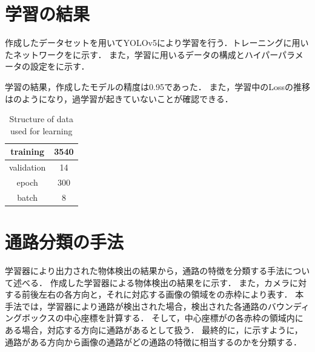 \documentclass[../main]{subfiles}
\begin{document}
        \section{学習の結果}
        作成したデータセットを用いてYOLOv5により学習を行う．トレーニングに用いたネットワークをに示す．
        また，学習に用いるデータの構成とハイパーパラメータの設定をに示す．
        

        学習の結果，作成したモデルの精度は0.95であった．
        また，学習中のLossの推移はのようになり，過学習が起きていないことが確認できる．

        \begin{table}[H]
            \caption{Structure of data used for learning}
            \centering
            \label{table::learning}
            \begin{tabular}{l|l}
            \hline
            \multicolumn{1}{c|}{training}   & \multicolumn{1}{c}{3540}                \\ \hline
            \multicolumn{1}{c|}{validation} & \multicolumn{1}{c}{14}                  \\ \hline
            \multicolumn{1}{c|}{epoch}      & \multicolumn{1}{c}{300}                \\ \hline
            \multicolumn{1}{c|}{batch}      & \multicolumn{1}{c}{8}                   \\ \hline
            \end{tabular}
        \end{table}

        \newpage

        \section{通路分類の手法}
        学習器により出力された物体検出の結果から，通路の特徴を分類する手法について述べる．
        作成した学習器による物体検出の結果をに示す．
        また，カメラに対する前後左右の各方向と，それに対応する画像の領域をの赤枠により表す．
        本手法では，学習器により通路が検出された場合，検出された各通路のバウンディングボックスの中心座標を計算する．
        そして，中心座標がの各赤枠の領域内にある場合，対応する方向に通路があるとして扱う．
        最終的に，に示すように，通路がある方向から画像の通路がどの通路の特徴に相当するのかを分類する．
\end{document}
